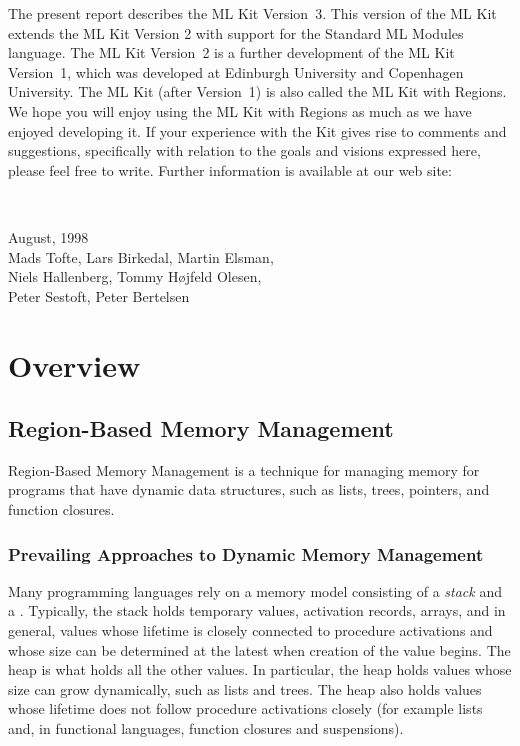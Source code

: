 \documentclass[12pt]{book}
\begin{document}
The present report describes the 
%
ML Kit Version~3. This version of the ML Kit extends the ML Kit
Version 2 with support for the Standard ML Modules language. The
%
ML Kit Version~2 is a further development of the 
%
ML Kit Version~1, which was developed at Edinburgh University and
Copenhagen University.  The ML Kit (after Version~1) is also called
the ML Kit with Regions.  We hope you will enjoy using the ML Kit with
Regions as much as we have enjoyed developing it. If your experience
with the Kit gives rise to comments and suggestions, specifically with
relation to the goals and visions expressed here, please feel free to
write.  Further information is available at our 
%
web site:
\begin{tabbing}
\hskip2cm\\
\hskip2cm\quad{}
\end{tabbing}

\begin{flushright}
August, 1998\\[1cm]
Mads Tofte, Lars Birkedal, Martin Elsman,\\
Niels Hallenberg, Tommy H\o jfeld Olesen,\\
Peter Sestoft, Peter Bertelsen
\end{flushright}
\part{Overview}
\chapter{Region-Based Memory Management}
\label{intro.sec}
Region-Based Memory Management is a technique for managing
memory for programs that have dynamic data structures, such as lists,
trees, pointers, and function closures.

\section{Prevailing Approaches to Dynamic Memory Management}
Many programming languages rely on a memory model consisting of a 
{\em stack} and a . Typically, the stack 
holds temporary values, activation records, arrays, and in general, values
whose lifetime is closely connected to procedure activations and whose size
can be determined at the latest when creation of the value begins.
The heap is what holds all the other values. In particular, the heap holds values whose size 
can grow dynamically, such as lists and trees. The heap also holds values whose lifetime
does not follow procedure activations closely (for example lists and, in functional
languages, function closures and suspensions).
\end{document}
